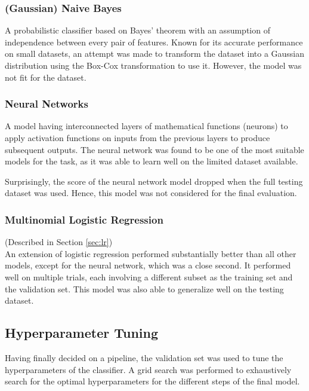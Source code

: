 \documentclass[conference]{IEEEtran}
\begin{document}
    \subsubsection{(Gaussian) Naive Bayes}
    \label{sec:gnb}
    A probabilistic classifier based on Bayes' theorem with an assumption of independence between every pair of features.
    Known for its accurate performance on small datasets, an attempt was made to transform the dataset into a Gaussian distribution using the Box-Cox transformation to use it.
    However, the model was not fit for the dataset.

    \subsubsection{Neural Networks}
    \label{sec:nn}
    A model having interconnected layers of mathematical functions (neurons) to apply activation functions on inputs from the previous layers to produce subsequent outputs.
    The neural network was found to be one of the most suitable models for the task, as it was able to learn well on the limited dataset available.

    Surprisingly, the score of the neural network model dropped when the full testing dataset was used.
    Hence, this model was not considered for the final evaluation.

    \subsubsection{Multinomial Logistic Regression}
    (Described in Section \ref{sec:lr}) \\
    An extension of logistic regression performed substantially better than all other models, except for the neural network, which
    was a close second.
    It performed well on multiple trials, each involving a different subset as the training set and the validation set.
    This model was also able to generalize well on the testing dataset.

    \subsection{Hyperparameter Tuning}
    \label{sec:hyperparam}
    Having finally decided on a pipeline, the validation set was used to tune the hyperparameters of the classifier.
    A grid search was performed to exhaustively search for the optimal hyperparameters for the different steps of the final model.
\end{document}

